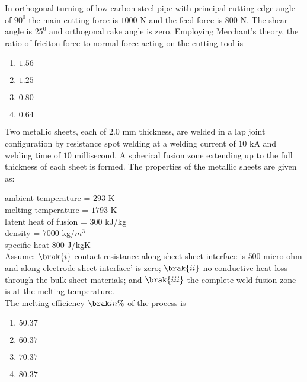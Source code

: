     \item In orthogonal turning of low carbon steel pipe with principal cutting edge angle of $90^{0}$ the main cutting force is $1000$ N and the feed force is $800$ N. The shear angle is $25^{0}$ and orthogonal rake angle is zero. Employing Merchant's theory, the ratio of friciton force to normal force acting on the cutting tool is
    \begin{multicols}{4}
        \begin{enumerate}
            \item $1.56$
            \item $1.25$
            \item $0.80$
            \item $0.64$
        \end{enumerate}
    \end{multicols}

    \item Two metallic sheets, each of $2.0$ mm thickness, are welded in a lap joint configuration by resistance spot welding at a welding current of $10$ kA and welding time of $10$ millisecond. A spherical fusion zone extending up to the full thickness of each sheet is formed. The properties of the metallic sheets are given as:

    ambient temperature = $293$ K \\
    melting temperature = $1793$ K \\
    latent heat of fusion = $300$ kJ/kg\\
    density = $7000$ kg/$m^{3}$ \\
    specific heat $800$ J/kgK\\
    Assume: $\brak{i}$ contact resistance along sheet-sheet interface is $500$ micro-ohm and along electrode-sheet interface' is zero; $\brak{ii}$ no conductive heat loss through the bulk sheet materials; and $\brak{iii}$ the complete weld fusion zone is at the melting temperature.\\

    The melting efficiency $\brak{in \%}$ of the process is
    \begin{multicols}{4}
        \begin{enumerate}
            \item $50.37$
            \item $60.37$
            \item $70.37$
            \item $80.37$
        \end{enumerate}
    \end{multicols}

